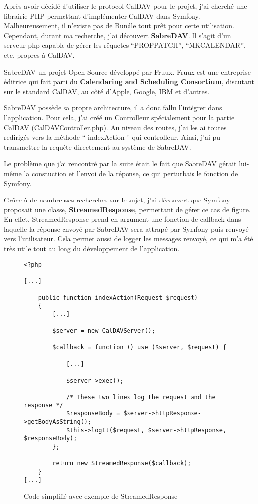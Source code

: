 Après avoir décidé d'utiliser le protocol CalDAV pour le projet, j'ai cherché une librairie PHP permettant d'implémenter CalDAV dans Symfony. Malheureusement, il n'existe pas de Bundle tout prêt pour cette utilisation. Cependant, durant ma recherche, j'ai découvert \textbf{SabreDAV}. Il s'agit d'un serveur php capable de gérer les rêquetes ``PROPPATCH'', ``MKCALENDAR'', etc. propres à CalDAV.

SabreDAV un projet Open Source développé par Fruux. Fruux est une entreprise éditrice qui fait parti du \textbf{Calendaring and Scheduling Consortium}, discutant sur le standard CalDAV, au côté d'Apple, Google, IBM et d'autres.

SabreDAV possède sa propre architecture, il a donc fallu l'intégrer dans l'application. Pour cela, j'ai créé un Controlleur spécialement pour la partie CalDAV (CalDAVController.php). Au niveau des routes, j'ai les ai toutes redirigés vers la méthode `` indexAction '' qui controlleur. Ainsi, j'ai pu transmettre la requête directement au système de SabreDAV.

Le problème que j'ai rencontré par la suite était le fait que SabreDAV gérait lui-même la constuction et l'envoi de la réponse, ce qui perturbais le fonction de Symfony.

Grâce à de nombreuses recherches sur le sujet, j'ai découvert que Symfony proposait une classe, \textbf{StreamedResponse}, permettant de gérer ce cas de figure. En effet, StreamedResponse prend en argument une fonction de callback dans laquelle la réponse envoyé par SabreDAV sera attrapé par Symfony puis renvoyé vers l'utilisateur. Cela permet aussi de logger les messages renvoyé, ce qui m'a été très utile tout au long du développement de l'application.

\begin{figure}[h]
\begin{lstlisting}[frame=single]
<?php

[...]

    public function indexAction(Request $request)
    {
        [...]

        $server = new CalDAVServer();

        $callback = function () use ($server, $request) {

            [...]

            $server->exec();

            /* These two lines log the request and the response */
            $responseBody = $server->httpResponse->getBodyAsString();
            $this->logIt($request, $server->httpResponse, $responseBody);
        };

        return new StreamedResponse($callback);
    }
[...]

\end{lstlisting}
\caption{Code simplifié avec exemple de StreamedResponse}
\end{figure}

